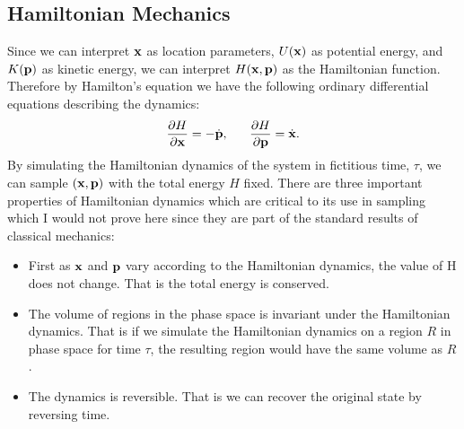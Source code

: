 \documentclass{article} %
\begin{document}
\subsection{Hamiltonian Mechanics}
Since we can interpret ${\bf x}$ as location parameters, $U({\bf x})$ as potential energy, and $K({\bf p})$ as kinetic energy, we can interpret $H({\bf x}, {\bf p})$ as the Hamiltonian function. Therefore by Hamilton's equation we have the following ordinary differential equations describing the dynamics:
\begin{equation} 
 \frac{\partial H}{\partial {\bf x}} = -\dot{{\bf p}}, \mbox{\space \space \space \space \space} \frac{\partial H}{\partial {\bf p}} = \dot{{\bf x}}.
\end{equation}
By simulating the Hamiltonian dynamics of the system in fictitious time, $\tau$, we can sample $({\bf x}, {\bf p})$ with the total energy $H$ fixed. There are three important properties of Hamiltonian dynamics which are critical to its use in sampling which I would not prove here since they are part of the standard results of classical mechanics:

\begin{itemize}
 \item First as ${\bf x}$ and ${\bf p}$ vary according to the Hamiltonian dynamics, the value of H does not change. That is the total energy is conserved.
 \item The volume of regions in the phase space is invariant under the Hamiltonian dynamics. That is if we simulate the Hamiltonian dynamics on a region $R$ in phase
 space for time $\tau$, the resulting region would have the same volume as $R$.
 \item The dynamics is reversible. That is we can recover the original state by reversing time.
\end{itemize}
\end{document}
